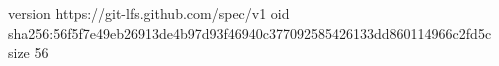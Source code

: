 version https://git-lfs.github.com/spec/v1
oid sha256:56f5f7e49eb26913de4b97d93f46940c377092585426133dd860114966c2fd5c
size 56
